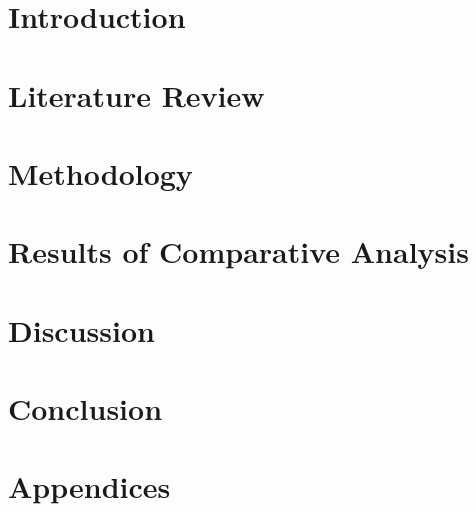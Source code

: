 \documentclass[11pt,jaso]{pnumasterh}
\begin{document}
\maketitle 
\pagestyle{empty}
\newpage
\pagestyle{plain} 
\setlength\cftsecnumwidth{2.3em}
\tableofcontents
\newpage
\listoffigures 
\newpage
\listoftables 
\newpage

\newpage

\newpage
{}

\section{Introduction}

\clearpage

\section{Literature Review} \label{literature_review}

\clearpage

\section{Methodology}

\clearpage

\section{Results of Comparative Analysis} \label{results}


\section{Discussion}

\clearpage

\section{Conclusion}

\clearpage
\nocite{*}


\clearpage

\appendix
\section*{Appendices}

\clearpage

\end{document}
